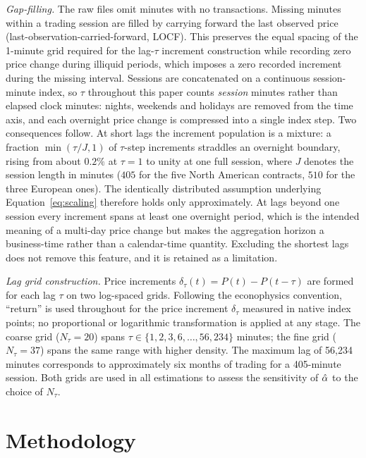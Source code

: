 \documentclass[conference]{IEEEtran}
\begin{document}
\textit{Gap-filling.} The raw files omit minutes with no transactions. Missing
minutes within a trading session are filled by carrying forward the last
observed price (last-observation-carried-forward, LOCF). This preserves the
equal spacing of the 1-minute grid required for the lag-$\tau$ increment
construction while recording zero price change during illiquid periods, which
imposes a zero recorded increment during the missing interval. Sessions are
concatenated on a continuous session-minute index, so $\tau$ throughout this
paper counts \emph{session} minutes rather than elapsed clock minutes: nights,
weekends and holidays are removed from the time axis, and each overnight price
change is compressed into a single index step. Two consequences follow. At
short lags the increment population is a mixture: a fraction $\min(\tau/J,1)$ of
$\tau$-step increments straddles an overnight boundary, rising from about
$0.2\%$ at $\tau=1$ to unity at one full session, where $J$ denotes the
session length in minutes ($405$ for the five North American contracts, $510$
for the three European ones). The identically distributed assumption
underlying Equation~\eqref{eq:scaling} therefore holds only approximately. At lags
beyond one session every increment spans at least one overnight period, which
is the intended meaning of a multi-day price change but makes the aggregation
horizon a business-time rather than a calendar-time quantity. Excluding the
shortest lags does not remove this feature, and it is retained as a limitation.

\textit{Lag grid construction.} Price increments $\delta_\tau(t) = P(t) -
P(t-\tau)$ are formed for each lag $\tau$ on two log-spaced grids. Following
the econophysics convention, ``return'' is used throughout for the price
increment $\delta_\tau$ measured in native index points; no proportional or
logarithmic transformation is applied at any stage. The coarse
grid ($N_\tau = 20$) spans $\tau \in \{1, 2, 3, 6, \ldots, 56{,}234\}$
minutes; the fine grid ($N_\tau = 37$) spans the same range with higher
density. The maximum lag of 56,234 minutes corresponds to approximately six
months of trading for a 405-minute session. Both grids are used in all
estimations to assess the sensitivity of $\hat{\alpha}$ to the choice of $N_\tau$.


\section{Methodology}
\label{sec:methodology}
\end{document}
